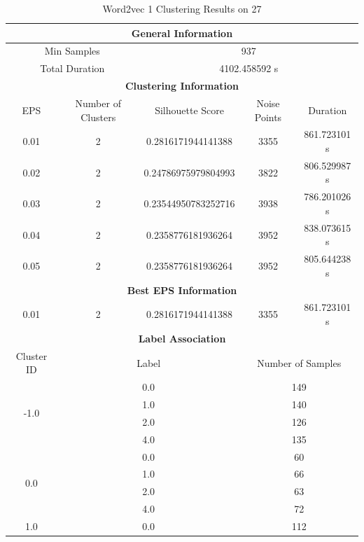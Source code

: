\begin{longtable}{|c|c|c|c|c|}
\caption{Word2vec 1 Clustering Results on 27} \label{tab:27_word2vec_1_clustering_results}\\
\hline
\multicolumn{5}{|c|}{\textbf{General Information}} \\
\hline
\multicolumn{2}{|c|}{Min Samples} & \multicolumn{3}{c|}{937} \\
\multicolumn{2}{|c|}{Total Duration} & \multicolumn{3}{c|}{4102.458592 s} \\
\hline
\multicolumn{5}{|c|}{\textbf{Clustering Information}} \\
\hline
EPS & Number of Clusters & Silhouette Score & Noise Points & Duration \\
0.01 & 2 & 0.2816171944141388 & 3355 & 861.723101 s\\
0.02 & 2 & 0.24786975979804993 & 3822 & 806.529987 s\\
0.03 & 2 & 0.23544950783252716 & 3938 & 786.201026 s\\
0.04 & 2 & 0.2358776181936264 & 3952 & 838.073615 s\\
0.05 & 2 & 0.2358776181936264 & 3952 & 805.644238 s\\
\hline
\multicolumn{5}{|c|}{\textbf{Best EPS Information}} \\
\hline
0.01 & 2 & 0.2816171944141388 & 3355 & 861.723101 s\\
\hline
\multicolumn{5}{|c|}{\textbf{Label Association}} \\
\hline
Cluster ID & \multicolumn{2}{c|}{Label} & \multicolumn{2}{c|}{Number of Samples} \\
\hline
\multirow{4}{*}{-1.0} & \multicolumn{2}{c|}{0.0} & \multicolumn{2}{c|}{149} \\
& \multicolumn{2}{c|}{1.0} & \multicolumn{2}{c|}{140} \\
& \multicolumn{2}{c|}{2.0} & \multicolumn{2}{c|}{126} \\
& \multicolumn{2}{c|}{4.0} & \multicolumn{2}{c|}{135} \\
\hline
\multirow{4}{*}{0.0} & \multicolumn{2}{c|}{0.0} & \multicolumn{2}{c|}{60} \\
& \multicolumn{2}{c|}{1.0} & \multicolumn{2}{c|}{66} \\
& \multicolumn{2}{c|}{2.0} & \multicolumn{2}{c|}{63} \\
& \multicolumn{2}{c|}{4.0} & \multicolumn{2}{c|}{72} \\
\hline
\multirow{4}{*}{1.0} & \multicolumn{2}{c|}{0.0} & \multicolumn{2}{c|}{112} \\

\end{longtable}
